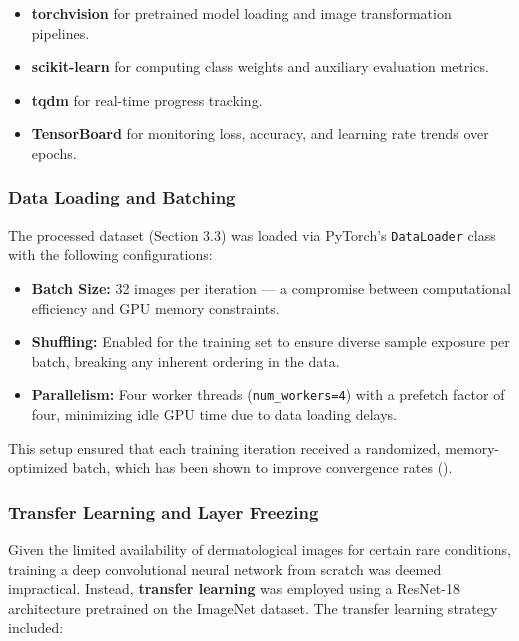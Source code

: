 \documentclass[
  12pt,
  oneside]{article}
\providecommand{\tightlist}{%
  \setlength{\itemsep}{0pt}\setlength{\parskip}{0pt}}
\begin{document}
\begin{itemize}
\tightlist
\item
  \textbf{torchvision} for pretrained model loading and image
  transformation pipelines.
\item
  \textbf{scikit-learn} for computing class weights and auxiliary
  evaluation metrics.
\item
  \textbf{tqdm} for real-time progress tracking.
\item
  \textbf{TensorBoard} for monitoring loss, accuracy, and learning rate
  trends over epochs.
\end{itemize}

\subsubsection{Data Loading and
Batching}\label{data-loading-and-batching}

The processed dataset (Section 3.3) was loaded via PyTorch's
\texttt{DataLoader} class with the following configurations:

\begin{itemize}
\tightlist
\item
  \textbf{Batch Size:} 32 images per iteration --- a compromise between
  computational efficiency and GPU memory constraints.
\item
  \textbf{Shuffling:} Enabled for the training set to ensure diverse
  sample exposure per batch, breaking any inherent ordering in the data.
\item
  \textbf{Parallelism:} Four worker threads (\texttt{num\_workers=4})
  with a prefetch factor of four, minimizing idle GPU time due to data
  loading delays.
\end{itemize}

This setup ensured that each training iteration received a randomized,
memory-optimized batch, which has been shown to improve convergence
rates ().

\subsubsection{Transfer Learning and Layer
Freezing}\label{transfer-learning-and-layer-freezing}

Given the limited availability of dermatological images for certain rare
conditions, training a deep convolutional neural network from scratch
was deemed impractical. Instead, \textbf{transfer learning} was employed
using a ResNet-18 architecture pretrained on the ImageNet dataset. The
transfer learning strategy included:
\end{document}
